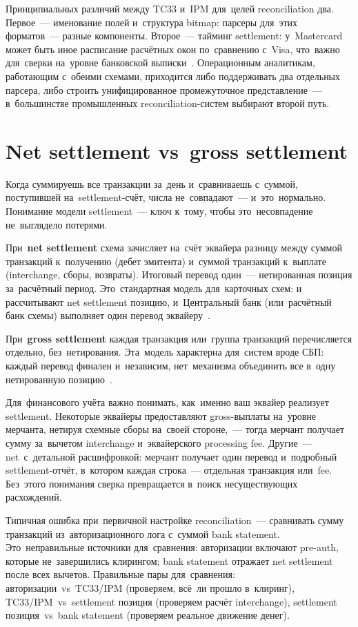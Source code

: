 Принципиальных различий между TC33 и~IPM для~целей reconciliation два.
Первое~--- именование полей и~структура bitmap: парсеры для~этих форматов~---
разные компоненты. Второе~--- тайминг settlement: у~Mastercard может быть
иное расписание расчётных окон по~сравнению с~Visa, что~важно для~сверки
на~уровне банковской выписки~. Операционным аналитикам,
работающим с~обеими схемами, приходится либо поддерживать два отдельных
парсера, либо строить унифицированное промежуточное представление~---
в~большинстве промышленных reconciliation-систем выбирают второй путь.


\section{Net settlement vs~gross settlement}
\label{sec:recon-net-vs-gross}

Когда суммируешь все транзакции за~день и~сравниваешь с~суммой, поступившей
на~settlement-счёт, числа не~совпадают~--- и~это~нормально. Понимание
модели settlement~--- ключ к~тому, чтобы это~несовпадение не~выглядело
потерями.

При~\textbf{net settlement} схема зачисляет на~счёт эквайера разницу
между суммой транзакций к~получению (дебет эмитента) и~суммой транзакций
к~выплате (interchange, сборы, возвраты). Итоговый перевод один~---
нетированная позиция за~расчётный период. Это~стандартная модель для~карточных
схем:  и~ рассчитывают net settlement
позицию, и~Центральный банк (или~расчётный банк схемы) выполняет один
перевод эквайеру~.

При~\textbf{gross settlement} каждая транзакция или~группа транзакций
перечисляется отдельно, без~нетирования. Эта~модель характерна для~систем
вроде СБП: каждый перевод финален и~независим, нет~механизма объединить
все в~одну нетированную позицию~.

Для~финансового учёта важно понимать, как~именно ваш эквайер реализует
settlement. Некоторые эквайеры предоставляют gross-выплаты на~уровне
мерчанта, нетируя схемные сборы на~своей стороне,~--- тогда мерчант
получает сумму за~вычетом interchange и~эквайерского processing fee.
Другие~--- net~с~детальной расшифровкой: мерчант получает один перевод
и~подробный settlement-отчёт, в~котором каждая строка~--- отдельная
транзакция или~fee. Без~этого понимания сверка превращается в~поиск
несуществующих расхождений.

\begin{practice}
  Типичная ошибка при~первичной настройке reconciliation~--- сравнивать
  сумму транзакций из~авторизационного лога с~суммой bank statement.
  Это~неправильные источники для~сравнения: авторизации включают pre-auth,
  которые не~завершились клирингом; bank statement отражает net settlement
  после всех вычетов. Правильные пары для~сравнения: авторизации~vs~TC33/IPM
  (проверяем, всё~ли прошло в~клиринг), TC33/IPM~vs~settlement позиция
  (проверяем расчёт interchange), settlement позиция~vs~bank statement
  (проверяем реальное движение денег).
\end{practice}


